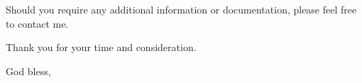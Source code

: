\documentclass{letter}
\begin{document}
\begin{letter}{}
\noindent
Should you require any additional information or documentation, please feel free to contact me.

\bigskip

\noindent
Thank you for your time and consideration.



\closing{God bless,\\
}


\end{letter}
\end{document}
